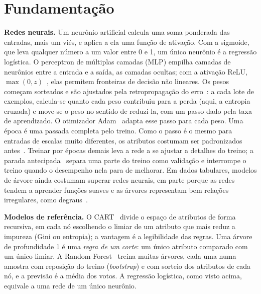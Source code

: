 \section{Fundamentação}

\textbf{Redes neurais.} Um neurônio artificial calcula uma soma ponderada das entradas, mais um viés, e aplica a ela uma função de ativação. Com a sigmoide, que leva qualquer número a um valor entre 0 e 1, um único neurônio é a regressão logística. O perceptron de múltiplas camadas (MLP) empilha camadas de neurônios entre a entrada e a saída, as camadas ocultas; com a ativação ReLU, $\max(0, z)$~\cite{nair:10}, elas permitem fronteiras de decisão não lineares. Os pesos começam sorteados e são ajustados pela retropropagação do erro~\cite{rumelhart:86}: a cada lote de exemplos, calcula-se quanto cada peso contribuiu para a perda (aqui, a entropia cruzada) e move-se o peso no sentido de reduzi-la, com um passo dado pela taxa de aprendizado. O otimizador Adam~\cite{kingma:15} adapta esse passo para cada peso. Uma época é uma passada completa pelo treino. Como o passo é o mesmo para entradas de escalas muito diferentes, os atributos costumam ser padronizados antes~\cite{lecun:98}. Treinar por épocas demais leva a rede a se ajustar a detalhes do treino; a parada antecipada~\cite{prechelt:98} separa uma parte do treino como validação e interrompe o treino quando o desempenho nela para de melhorar. Em dados tabulares, modelos de árvore ainda costumam superar redes neurais, em parte porque as redes tendem a aprender funções suaves e as árvores representam bem relações irregulares, como degraus~\cite{grinsztajn:22}.

\textbf{Modelos de referência.} O CART~\cite{breiman:84} divide o espaço de atributos de forma recursiva, em cada nó escolhendo o limiar de um atributo que mais reduz a impureza (Gini ou entropia); a vantagem é a legibilidade das regras. Uma árvore de profundidade 1 é uma \emph{regra de um corte}: um único atributo comparado com um único limiar. A Random Forest~\cite{breiman:01} treina muitas árvores, cada uma numa amostra com reposição do treino (\emph{bootstrap}) e com sorteio dos atributos de cada nó, e a previsão é a média dos votos. A regressão logística, como visto acima, equivale a uma rede de um único neurônio.
